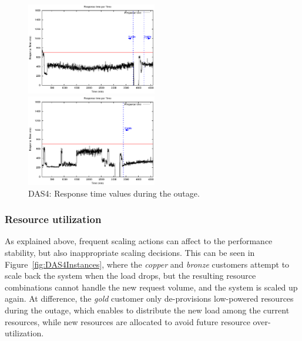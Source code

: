 \begin{figure}[htb]
\begin{minipage}[b]{0.2\linewidth}
		\vspace{-4mm}
		\includegraphics[width=\linewidth,height=4cm]{images/exps2011/medium_up/das/proxyDataPoints_output.eps}
		\vspace{-4mm}
	\end{minipage}
\hfill
\begin{minipage}[b]{0.19\linewidth}
		\vspace{-4mm}
		\includegraphics[width=\linewidth,height=4cm]{images/exps2011/high/das/proxyDataPoints_output.eps}
		\vspace{-4mm}
	\end{minipage}
\caption{DAS4: Response time values during the outage.}
\label{fig:DAS4ResponseTime}
\end{figure}


\subsubsection{Resource utilization}

As explained above, frequent scaling actions can affect to the performance stability, but also inappropriate scaling decisions. This can be seen in Figure~\ref{fig:DAS4Instances}, where the \emph{copper} and \emph{bronze} customers attempt to scale back the system when the load drops, but the resulting resource combinations cannot handle the new request volume, and the system is scaled up again.  At difference, the \emph{gold} customer only de-provisions low-powered resources during the outage, which enables to distribute the new load among the current resources, while new resources are allocated to avoid future resource over-utilization. 


